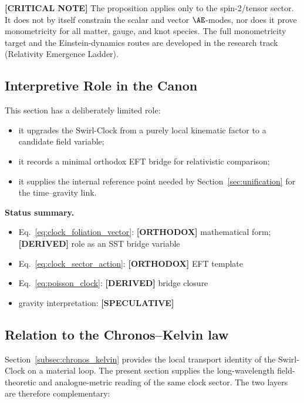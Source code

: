 \documentclass[11pt]{article}
\theoremstyle{definition}
\theoremstyle{plain}
\theoremstyle{remark}
\begin{document}
        \textbf{[CRITICAL NOTE]} The proposition applies only to the spin-2/tensor
        sector. It does not by itself constrain the scalar and vector \(\AE\)-modes,
        nor does it prove monometricity for all matter, gauge, and knot species. The
        full monometricity target and the Einstein-dynamics routes are developed in the
        research track (Relativity Emergence Ladder).

    \subsection{Interpretive Role in the Canon}

        This section has a deliberately limited role:
        \begin{itemize}
            \item it upgrades the Swirl-Clock from a purely local kinematic factor to a candidate field variable;
            \item it records a minimal orthodox EFT bridge for relativistic comparison;
            \item it supplies the internal reference point needed by Section~\ref{sec:unification} for the time--gravity link.
        \end{itemize}

        \textbf{Status summary.}
        \begin{itemize}
            \item Eq.~\eqref{eq:clock_foliation_vector}: \textbf{[ORTHODOX]} mathematical form; \textbf{[DERIVED]} role as an SST bridge variable
            \item Eq.~\eqref{eq:clock_sector_action}: \textbf{[ORTHODOX]} EFT template
            \item Eq.~\eqref{eq:poisson_clock}: \textbf{[DERIVED]} bridge closure
            \item gravity interpretation: \textbf{[SPECULATIVE]}
        \end{itemize}

    \subsection{Relation to the Chronos--Kelvin law}

        Section~\ref{subsec:chronos_kelvin} provides the local transport identity of the Swirl-Clock on a material loop. The present section supplies the long-wavelength field-theoretic and analogue-metric reading of the same clock sector. The two layers are therefore complementary:
\end{document}

